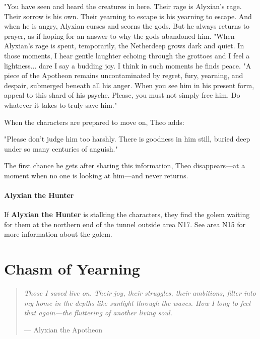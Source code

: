 \documentclass[letterpaper, 11pt, bg=full, twocolumn]{dndbook}
\begin{document}
\begin{DndReadAloud}
"You have seen and heard the creatures in here. Their rage is Alyxian's rage. Their sorrow is his own. Their yearning to escape is his yearning to escape. And when he is angry, Alyxian curses and scorns the gods. But he always returns to prayer, as if hoping for an answer to why the gods abandoned him.
"When Alyxian's rage is spent, temporarily, the Netherdeep grows dark and quiet. In those moments, I hear gentle laughter echoing through the grottoes and I feel a lightness... dare I say a budding joy. I think in such moments he finds peace.
"A piece of the Apotheon remains uncontaminated by regret, fury, yearning, and despair, submerged beneath all his anger. When you see him in his present form, appeal to this shard of his psyche. Please, you must not simply free him. Do whatever it takes to truly save him."
\end{DndReadAloud}

When the characters are prepared to move on, Theo adds:

\begin{DndReadAloud}
"Please don't judge him too harshly. There is goodness in him still, buried deep under so many centuries of anguish."
\end{DndReadAloud}

The first chance he gets after sharing this information, Theo disappears---at a moment when no one is looking at him---and never returns.

\paragraph{Alyxian the Hunter}

If \textbf{Alyxian the Hunter} is stalking the characters, they find the golem waiting for them at the northern end of the tunnel outside area N17. See area N15 for more information about the golem.
\section{Chasm of Yearning}

\begin{quotation}
\em
Those I saved live on. Their joy, their struggles, their ambitions, filter into my home in the depths like sunlight through the waves. How I long to feel that again---the fluttering of another living soul.

\hfill --- Alyxian the Apotheon
\end{quotation}
\end{document}
